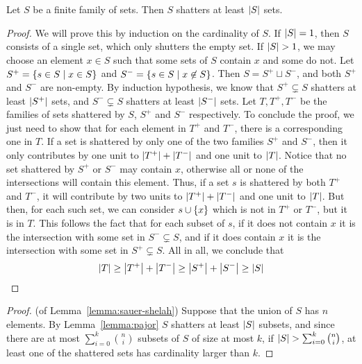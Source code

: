         \label{lemma:pajor}
            Let $S$ be a finite family of sets.
            Then $S$ shatters at least $\left| S \right|$ sets.
            \begin{proof}
                We will prove this by induction on the cardinality of $S$.
                If $\left| S \right| = 1$, then $S$ consists of a single set, which only shutters the empty set.
                If $\left| S \right| > 1$, we may choose an element $x \in S$ such that some sets of $S$ contain $x$ and some do not.
                Let $S^+ = \left\{ s \in S \mid x \in S \right\}$ and $S^- = \left\{ s \in S \mid x \not\in S \right\}$.
                Then $S = S^+ \sqcup S^-$, and both $S^+$ and $S^-$ are non-empty.
                By induction hypothesis, we know that $S^+ \subsetneq S$ shatters at least $\left| S^+ \right|$ sets,
                and $S^- \subsetneq S$ shatters at least $\left| S^- \right|$ sets.
                Let $T, T^+, T^-$ be the families of sets shattered by $S$, $S^+$ and $S^-$ respectively.
                To conclude the proof, we just need to show that for each element in $T^+$ and $T^-$, there is a corresponding
                one in $T$.
                If a set is shattered by only one of the two families $S^+$ and $S^-$, then it only contributes by one unit
                to $\left| T^+ \right| + \left| T^- \right|$ and one unit to $\left| T \right|$.
                Notice that no set shattered by $S^+$ or $S^-$ may contain $x$, otherwise all or none of the intersections
                will contain this element.
                Thus, if a set $s$ is shattered by both $T^+$ and $T^-$, it will contribute by two units to
                $\left| T^+ \right| + \left| T^- \right|$ and one unit to $\left| T \right|$.
                But then, for each such set, we can consider $s \cup \left\{ x \right\}$ which is not in $T^+$ or $T^-$, but it is in $T$.
                This follows the fact that for each subset of $s$, if it does not contain $x$ it is the intersection with some
                set in $S^- \subsetneq S$, and if it does contain $x$ it is the intersection with some set in $S^+ \subsetneq S$.
                All in all, we conclude that
                \[
                    \left| T \right| \geq \left| T^+ \right| + \left| T^- \right| \geq \left| S^+ \right| + \left| S^- \right|
                                    \geq \left| S \right|
                \]
            \end{proof}

        \begin{proof} (of Lemma~\ref{lemma:sauer-shelah})
            Suppose that the union of $S$ has $n$ elements.
            By Lemma~\ref{lemma:pajor} $S$ shatters at least $\left| S \right|$ subsets, and since there are at most
            $\sum_{i=0}^k \binom{n}{i}$ subsets of $S$ of size at most $k$, if
            $\left| S \right| > \sum_{i=0}^k \binom{n}{i}$, at least one of the shattered sets has cardinality larger than $k$.
        \end{proof}


